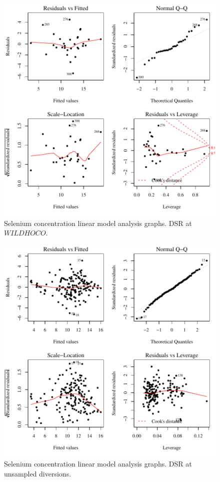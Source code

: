 \begin{figure}[htbp]
	\begin{center}
	\includegraphics[width=6in]{"Figures/Results_DSR/Conc Model lm-fit WIL"}
	\caption{Selenium concentration linear model analysis graphs.  DSR at $WILDHOCO$.}
	\end{center}
\end{figure}
\newpage

\begin{figure}[htbp]
	\begin{center}
	\includegraphics[width=6in]{"Figures/Results_DSR/Conc Model lm-fit DDIV"}
	\caption{Selenium concentration linear model analysis graphs.  DSR at unsampled diversions.}
	\end{center}
\end{figure}
\newpage